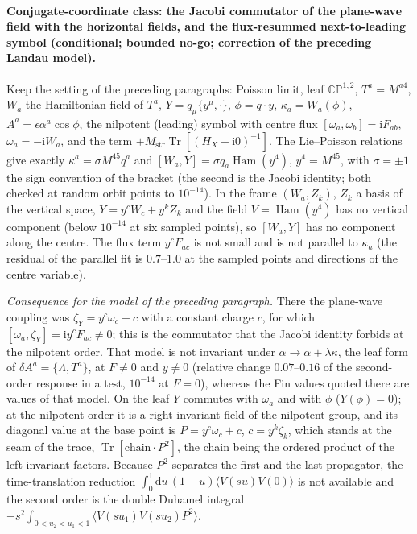 \paragraph{Conjugate-coordinate class: the Jacobi commutator of the plane-wave field with the horizontal fields, and the flux-resummed next-to-leading symbol (conditional; bounded no-go; correction of the preceding Landau model).}
Keep the setting of the preceding paragraphs: Poisson limit, leaf \(\mathbb{CP}^{1,2}\), \(T^a=M^{a4}\), \(W_a\) the Hamiltonian field of \(T^a\), \(Y=q_\mu\{y^\mu,\cdot\}\), \(\phi=q\cdot y\), \(\kappa_a=W_a(\phi)\), \(A^a=\epsilon\alpha^a\cos\phi\), the nilpotent (leading) symbol with centre flux \([\omega_a,\omega_b]=\mathrm iF_{ab}\), \(\omega_a=-\mathrm iW_a\), and the term \(+M_{\mathrm{str}}\operatorname{Tr}[(H_X-\mathrm i0)^{-1}]\). The Lie--Poisson relations give exactly \(\kappa^a=\sigma M^{45}q^a\) and \([W_a,Y]=\sigma q_a\operatorname{Ham}(y^4)\), \(y^4=M^{45}\), with \(\sigma=\pm1\) the sign convention of the bracket (the second is the Jacobi identity; both checked at random orbit points to \(10^{-14}\)). In the frame \((W_a,Z_k)\), \(Z_k\) a basis of the vertical space, \(Y=y^cW_c+y^kZ_k\) and the field \(V=\operatorname{Ham}(y^4)\) has no vertical component (below \(10^{-14}\) at six sampled points), so \([W_a,Y]\) has no component along the centre. The flux term \(y^cF_{ac}\) is not small and is not parallel to \(\kappa_a\) (the residual of the parallel fit is \(0.7\)--\(1.0\) at the sampled points and directions of the centre variable).

\emph{Consequence for the model of the preceding paragraph.} There the plane-wave coupling was \(\zeta_Y=y^c\omega_c+c\) with a constant charge \(c\), for which \([\omega_a,\zeta_Y]=\mathrm iy^cF_{ac}\ne0\); this is the commutator that the Jacobi identity forbids at the nilpotent order. That model is not invariant under \(\alpha\to\alpha+\lambda\kappa\), the leaf form of \(\delta A^a=\{\Lambda,T^a\}\), at \(F\ne0\) and \(y\ne0\) (relative change \(0.07\)--\(0.16\) of the second-order response in a test, \(10^{-14}\) at \(F=0\)), whereas the Fin values quoted there are values of that model. On the leaf \(Y\) commutes with \(\omega_a\) and with \(\phi\) (\(Y(\phi)=0\)); at the nilpotent order it is a right-invariant field of the nilpotent group, and its diagonal value at the base point is \(P=y^c\omega_c+c\), \(c=y^k\zeta_k\), which stands at the seam of the trace, \(\operatorname{Tr}[\text{chain}\cdot P^2]\), the chain being the ordered product of the left-invariant factors. Because \(P^2\) separates the first and the last propagator, the time-translation reduction \(\int_0^1\mathrm du\,(1-u)\langle V(su)V(0)\rangle\) is not available and the second order is the double Duhamel integral \(-s^2\int_{0<u_2<u_1<1}\langle V(su_1)V(su_2)P^2\rangle\).

